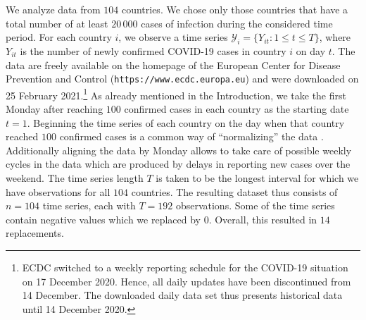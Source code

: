 \documentclass[a4paper,12pt]{article}
\numberwithin{equation}{section}
\begin{document}
We analyze data from $104$ countries. We chose only those countries that have a total number of at least $20\,000$ cases of infection during the considered time period. For each country $i$, we observe a time series $\mathcal{Y}_i = \{ Y_{it}: 1 \le t \le T \}$, where $Y_{it}$ is the number of newly confirmed COVID-19 cases in country $i$ on day $t$. The data are freely available on the homepage of the European Center for Disease Prevention and Control (\texttt{https://www.ecdc.europa.eu}) and were downloaded on 25 February 2021.\footnote{ECDC switched to a weekly reporting schedule for the COVID-19 situation on 17 December 2020. Hence, all daily updates have been discontinued from 14 December. The downloaded daily data set thus presents historical data until 14 December 2020.} As already mentioned in the Introduction, we take the first Monday after reaching $100$ confirmed cases in each country as the starting date $t=1$. 
Beginning the time series of each country on the day when that country reached $100$ confirmed cases is a common way of ``normalizing'' the data \citep[see e.g.][]{Cohen2020}. Additionally aligning the data by Monday allows to take care of possible weekly cycles in the data which are produced by delays in reporting new cases over the weekend. 
The time series length $T$ is taken to be the longest interval for which we have observations for all $104$ countries. The resulting dataset thus consists of $n = 104$ time series, each with $T = 192$ observations. Some of the time series contain negative values which we replaced by $0$. Overall, this resulted in $14$ replacements.
\end{document}
